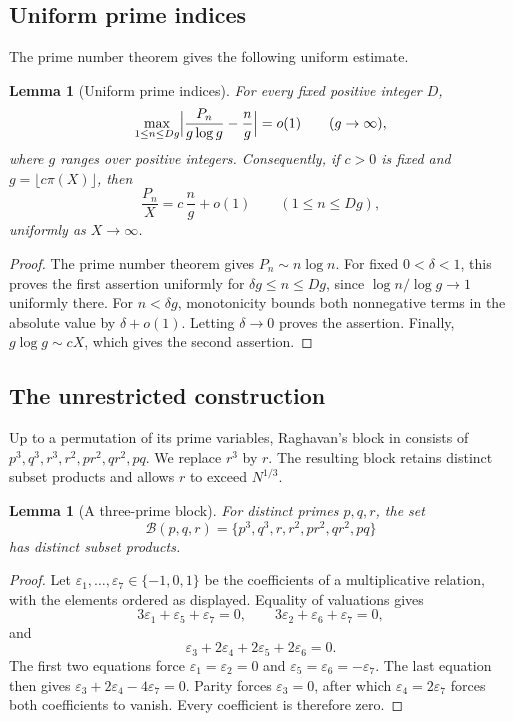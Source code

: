 \documentclass[11pt]{article}
\numberwithin{equation}{section}
\newtheorem{lemma}[theorem]{Lemma}
\theoremstyle{remark}
\newcommand{\eps}{\varepsilon}
\begin{document}
\subsection{Uniform prime indices}
The prime number theorem gives the following uniform estimate.

\begin{lemma}[Uniform prime indices]\label{lem:unif}
For every fixed positive integer $D$,
\[
\max_{1\le n\le Dg}\Bigl|\frac{P_n}{g\log g}-\frac ng\Bigr|=o(1)\qquad(g\to\infty),
\]
where $g$ ranges over positive integers. Consequently, if $c>0$ is fixed and $g=\lfloor c\pi(X)\rfloor$, then
\[
\frac{P_n}X=c\,\frac ng+o(1)\qquad(1\le n\le Dg),
\]
uniformly as $X\to\infty$.
\end{lemma}

\begin{proof}
The prime number theorem gives $P_n\sim n\log n$. For fixed $0<\delta<1$, this proves the first assertion uniformly for $\delta g\le n\le Dg$, since $\log n/\log g\to1$ uniformly there. For $n<\delta g$, monotonicity bounds both nonnegative terms in the absolute value by $\delta+o(1)$. Letting $\delta\to0$ proves the assertion. Finally, $g\log g\sim cX$, which gives the second assertion.
\end{proof}

\subsection{The unrestricted construction}
Up to a permutation of its prime variables, Raghavan's block in \cite[proof of Theorem~1.4]{Raghavan} consists of $p^3,q^3,r^3,r^2,pr^2,qr^2,pq$. We replace $r^3$ by $r$. The resulting block retains distinct subset products and allows $r$ to exceed $N^{1/3}$.

\begin{lemma}[A three-prime block]\label{lem:B3}
For distinct primes $p,q,r$, the set
\[
\mathcal B(p,q,r)=\{p^3,q^3,r,r^2,pr^2,qr^2,pq\}
\]
has distinct subset products.
\end{lemma}

\begin{proof}
Let $\eps_1,\dots,\eps_7\in\{-1,0,1\}$ be the coefficients of a multiplicative relation, with the elements ordered as displayed. Equality of valuations gives
\[
3\eps_1+\eps_5+\eps_7=0,\qquad3\eps_2+\eps_6+\eps_7=0,
\]
and
\[
\eps_3+2\eps_4+2\eps_5+2\eps_6=0.
\]
The first two equations force $\eps_1=\eps_2=0$ and $\eps_5=\eps_6=-\eps_7$. The last equation then gives $\eps_3+2\eps_4-4\eps_7=0$. Parity forces $\eps_3=0$, after which $\eps_4=2\eps_7$ forces both coefficients to vanish. Every coefficient is therefore zero.
\end{proof}
\end{document}
